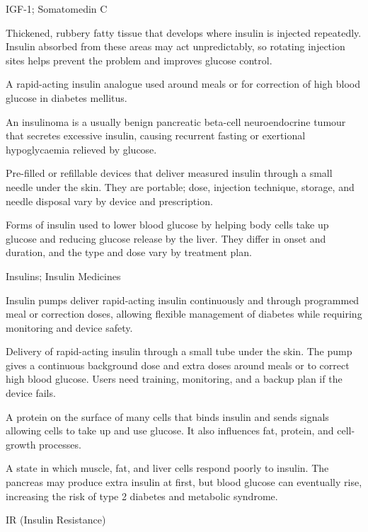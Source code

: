 \synonyms
IGF-1; Somatomedin C

 Thickened, rubbery fatty tissue that develops where insulin is injected repeatedly. Insulin absorbed from these areas may act unpredictably, so rotating injection sites helps prevent the problem and improves glucose control.

 A rapid-acting insulin analogue used around meals or for correction of high blood glucose in diabetes mellitus.

 An insulinoma is a usually benign pancreatic beta-cell neuroendocrine tumour that secretes excessive insulin, causing recurrent fasting or exertional hypoglycaemia relieved by glucose.

 Pre-filled or refillable devices that deliver measured insulin through a small needle under the skin. They are portable; dose, injection technique, storage, and needle disposal vary by device and prescription.

 Forms of insulin used to lower blood glucose by helping body cells take up glucose and reducing glucose release by the liver. They differ in onset and duration, and the type and dose vary by treatment plan.

\synonyms
Insulins; Insulin Medicines

 Insulin pumps deliver rapid-acting insulin continuously and through programmed meal or correction doses, allowing flexible management of diabetes while requiring monitoring and device safety.

 Delivery of rapid-acting insulin through a small tube under the skin. The pump gives a continuous background dose and extra doses around meals or to correct high blood glucose. Users need training, monitoring, and a backup plan if the device fails.

 A protein on the surface of many cells that binds insulin and sends signals allowing cells to take up and use glucose. It also influences fat, protein, and cell-growth processes.

 A state in which muscle, fat, and liver cells respond poorly to insulin. The pancreas may produce extra insulin at first, but blood glucose can eventually rise, increasing the risk of type 2 diabetes and metabolic syndrome.

\synonyms
IR (Insulin Resistance)

